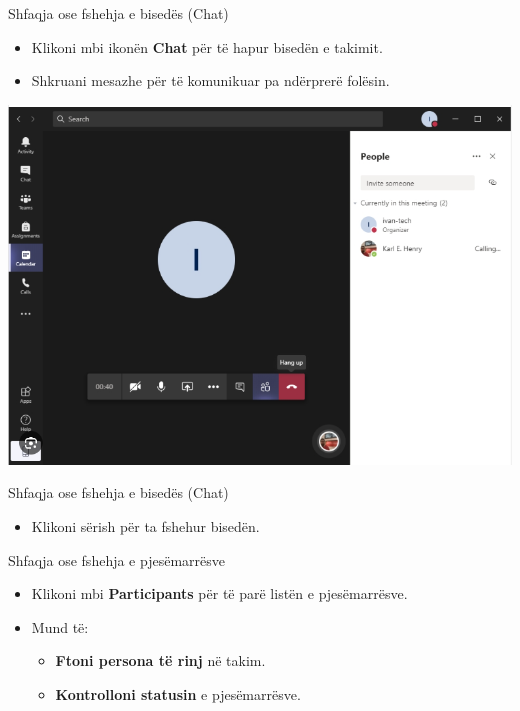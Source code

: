 \documentclass[
  ignorenonframetext,
]{beamer}
\providecommand{\tightlist}{%
  \setlength{\itemsep}{0pt}\setlength{\parskip}{0pt}}
\begin{document}
\begin{frame}{Shfaqja ose fshehja e bisedës (Chat)}
\label{shfaqja-ose-fshehja-e-biseduxebs-chat}
\begin{itemize}
\item
  Klikoni mbi ikonën \textbf{Chat} për të hapur bisedën e takimit.
\item
  Shkruani mesazhe për të komunikuar pa ndërprerë folësin.
\end{itemize}

\includegraphics{./images/teams9.png}
\end{frame}

\begin{frame}{Shfaqja ose fshehja e bisedës (Chat)}
\label{shfaqja-ose-fshehja-e-biseduxebs-chat-1}
\begin{itemize}
\tightlist
\item
  Klikoni sërish për ta fshehur bisedën.
\end{itemize}
\end{frame}

\begin{frame}{Shfaqja ose fshehja e pjesëmarrësve}
\label{shfaqja-ose-fshehja-e-pjesuxebmarruxebsve}
\begin{itemize}
\item
  Klikoni mbi \textbf{Participants} për të parë listën e pjesëmarrësve.
\item
  Mund të:

  \begin{itemize}
  \tightlist
  \item
    \textbf{Ftoni persona të rinj} në takim.\\
  \item
    \textbf{Kontrolloni statusin} e pjesëmarrësve.
  \end{itemize}
\end{itemize}
\end{frame}
\end{document}
